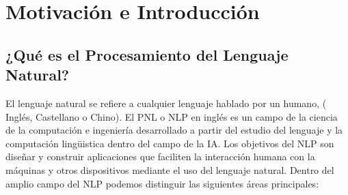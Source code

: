 \chapter{Motivación e Introducción}\label{ch:introduction}

\section{¿Qué es el Procesamiento del Lenguaje Natural?}
\label{sec:whatisnlp}

El lenguaje natural se refiere a cualquier lenguaje hablado por un humano, (\eg
Inglés, Castellano o Chino). El \ac{PNL} o \ac{NLP} en inglés es un campo de la
ciencia de la computación e ingeniería desarrollado a partir del estudio del
lenguaje y la computación lingüistica dentro del campo de la \ac{IA}. Los
objetivos del \ac{NLP} son diseñar y construir aplicaciones que faciliten la
interacción humana con la máquinas y otros dispositivos mediante el uso del
lenguaje natural. Dentro del amplio campo del \ac{NLP} podemos distinguir las
siguientes áreas principales:

